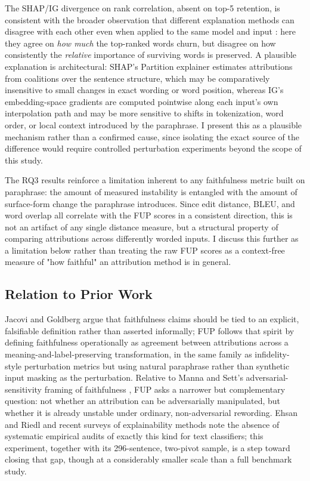 The SHAP/IG divergence on rank correlation, absent on top-5 retention,
is consistent with the broader observation that different explanation
methods can disagree with each other even when applied to the same
model and input \citep{krishna2022disagreement}: here they agree on
\emph{how much} the top-ranked words churn, but disagree on how
consistently the \emph{relative} importance of surviving words is
preserved. A plausible explanation is architectural: SHAP's Partition
explainer estimates attributions from coalitions over the sentence
structure, which may be comparatively insensitive to small changes in
exact wording or word position, whereas IG's embedding-space gradients
are computed pointwise along each input's own interpolation path and may
be more sensitive to shifts in tokenization, word order, or local
context introduced by the paraphrase. I present this as a plausible
mechanism rather than a confirmed cause, since isolating the exact
source of the difference would require controlled perturbation
experiments beyond the scope of this study.

The RQ3 results reinforce a limitation inherent to any faithfulness
metric built on paraphrase: the amount of measured instability is
entangled with the amount of surface-form change the paraphrase
introduces. Since edit distance, BLEU, and word overlap all correlate
with the FUP scores in a consistent direction, this is not an artifact
of any single distance measure, but a structural property of comparing
attributions across differently worded inputs. I discuss this further as
a limitation below rather than treating the raw FUP scores as a
context-free measure of "how faithful" an attribution method is in
general.

\subsection{Relation to Prior Work}

Jacovi and Goldberg \citep{jacovi2020towards} argue that faithfulness
claims should be tied to an explicit, falsifiable definition rather than
asserted informally; FUP follows that spirit by defining faithfulness
operationally as agreement between attributions across a
meaning-and-label-preserving transformation, in the same family as
infidelity-style perturbation metrics \citep{yeh2019infidelity} but using
natural paraphrase rather than synthetic input masking as the
perturbation. Relative to Manna and Sett's adversarial-sensitivity
framing of faithfulness \citep{manna2024faithfulness}, FUP asks a
narrower but complementary question: not whether an attribution can be
adversarially manipulated, but whether it is already unstable under
ordinary, non-adversarial rewording. Ehsan and Riedl
\citep{ehsan2024explainable} and recent surveys of explainability
methods \citep{lyu2024towards,palikhe2025towards} note the absence of
systematic empirical audits of exactly this kind for text classifiers;
this experiment, together with its 296-sentence, two-pivot sample, is a
step toward closing that gap, though at a considerably smaller scale
than a full benchmark study.

